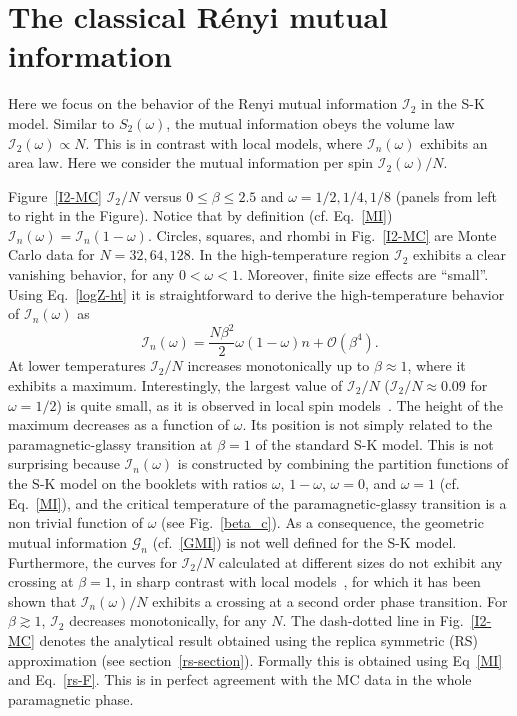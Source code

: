 \documentclass[twocolumn,superscriptaddress,prb,10pt]{revtex4-1}
\begin{document}
\section{The classical R\'enyi mutual information}
\label{I2-section}

Here we focus on the behavior of the Renyi mutual information ${\mathcal I}_2$ in 
the S-K model. Similar to $S_2(\omega)$, the mutual information obeys the volume 
law ${\mathcal I}_2(\omega)\propto N$. This is in contrast with local models, 
where ${\mathcal I}_n(\omega)$ exhibits an area law. Here we consider the 
mutual information per spin ${\mathcal I}_2(\omega)/N$. 

Figure~\ref{I2-MC} ${\mathcal I}_2/N$ versus $0\le\beta\le 2.5$ and $\omega=1/2,1/4,1/8$ 
(panels from left to right in the Figure). Notice that by definition (cf. Eq.~\eqref{MI}) 
${\mathcal I}_n(\omega)={\mathcal I}_n(1-\omega)$. Circles, squares, and rhombi in 
Fig.~\ref{I2-MC} are Monte Carlo data for $N=32,64,128$. 
In the high-temperature region ${\mathcal I}_2$ exhibits a clear vanishing 
behavior, for any $0<\omega<1$. Moreover, finite size effects are ``small''. 
Using Eq.~\eqref{logZ-ht} it is straightforward to derive the high-temperature 
behavior of ${\mathcal I}_n(\omega)$ as  
%
\begin{equation}
{\mathcal I}_n(\omega)=\frac{N\beta^2}{2}\omega(1-\omega)n+{\mathcal O}
(\beta^4).
\end{equation}
%
At lower temperatures ${\mathcal I}_2/N$ increases monotonically up to $\beta\approx 1$, 
where it exhibits a maximum. Interestingly, the largest value of ${\mathcal I}_2/N$ 
(${\mathcal I}_2/N\approx 0.09$ for $\omega=1/2$) is quite small, as it is observed in 
local spin models~\cite{jaconis-2013}. The height of the maximum decreases as a function of 
$\omega$. Its position is not simply related to the paramagnetic-glassy transition at $\beta=1$ 
of the standard S-K model. This is not surprising because ${\mathcal I}_n(\omega)$ is constructed 
by combining the partition functions of the S-K model on the booklets with ratios $\omega$, 
$1-\omega$, $\omega=0$, and $\omega=1$ (cf. Eq.~\eqref{MI}), and the critical temperature of 
the paramagnetic-glassy transition is a non trivial function of $\omega$ (see Fig.~\ref{beta_c}). 
As a consequence, the geometric mutual information ${\mathcal G}_n$ (cf.~\eqref{GMI}) 
is not well defined for the S-K model. 
Furthermore, the curves for ${\mathcal I}_2/N$ calculated at different sizes do not exhibit any 
crossing at $\beta=1$, in sharp contrast with local models~\cite{jaconis-2013}, for which it has 
been shown that ${\mathcal I}_n(\omega)/N$ exhibits a crossing at a second order phase transition. 
For $\beta\gtrsim 1$, ${\mathcal I}_2$ decreases monotonically, for any $N$. 
The dash-dotted line in Fig.~\ref{I2-MC} denotes the analytical result obtained using the replica 
symmetric (RS) approximation (see section~\ref{rs-section}). Formally this is obtained using 
Eq~\eqref{MI} and Eq.~\eqref{rs-F}. This is in perfect agreement with the 
MC data in the whole paramagnetic phase.  
\end{document}
